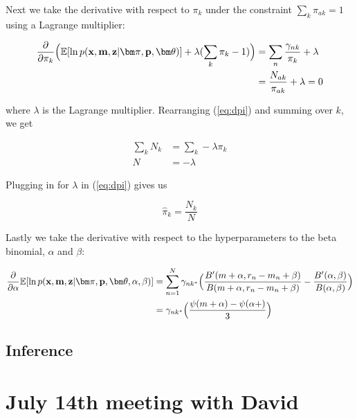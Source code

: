 \documentclass[a4paper]{article}
\newcommand{\vp}{{\bf p}}
\newcommand{\vz}{{\bf z}}
\newcommand{\vm}{{\bf m}}
\newcommand{\vx}{{\bf x}}
\newcommand{\vpi}{{\bm \pi}}
\newcommand{\vtheta}{{\bm \theta}}
\newcommand{\E}{\mathbb{E}}
\begin{document}
Next we take the derivative with respect to $\pi_{k}$ under the constraint $\sum_k \pi_{ak} = 1$ using a Lagrange multiplier:

\begin{align}
\frac{\partial}{\partial \pi_{k}} \Big( \E [ \ln p(\vx, \vm ,\vz | \vpi, \vp, \vtheta) ] + \lambda ( \sum_k \pi_{k} - 1) \Big) &= \sum_{n} \frac{\gamma_{nk}}{\pi_{k}} + \lambda \nonumber \\
																   &= \frac{N_{ak}}{\pi_{ak}} + \lambda = 0 \label{eq:dpi}
\end{align}

where $\lambda$ is the Lagrange multiplier. Rearranging (\ref{eq:dpi}) and summing over $k$, we get

\begin{align*}
\sum_k N_{k} &= \sum_k - \lambda \pi_{k} \\
      N &= - \lambda
\end{align*}

Plugging in for $\lambda$ in (\ref{eq:dpi}) gives us

\begin{equation}
\hat{\pi}_{k} = \frac{N_{k}}{N}
\end{equation}

Lastly we take the derivative with respect to the hyperparameters to the beta binomial,  $\alpha$ and $\beta$:\

\begin{align*}
\frac{\partial}{\partial \alpha} \E [ \ln p(\vx, \vm ,\vz | \vpi, \vp, \vtheta, \alpha, \beta) ] &= \sum_{n = 1}^{N} \gamma_{nk^*} \Big( \frac{B'(m + \alpha, r_n - m_n + \beta)}{B(m + \alpha, r_n - m_n + \beta)} - \frac{B'(\alpha, \beta)}{B(\alpha, \beta)} \Big) \\
		&=  \gamma_{nk^*} \Big ( \frac{\psi(m + \alpha) - \psi(\alpha + )}{3} \Big )
\end{align*}



\subsection{Inference}


\section{July 14th meeting with David}
\end{document}

